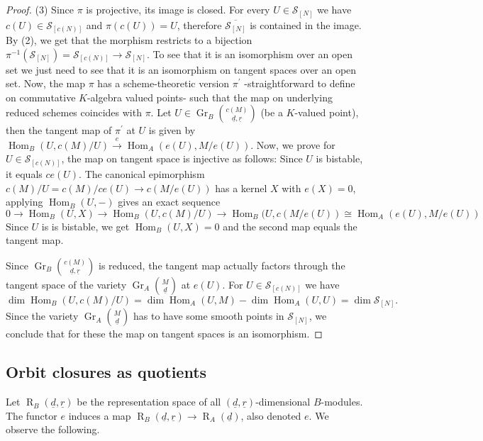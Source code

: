 \documentclass[11pt,a4paper]{amsart}
\theoremstyle{plain}
\theoremstyle{definition}
\begin{document}
\begin{proof}
(3) Since $\pi $ is projective, its image is closed. For every $U\in {\mathcal{S}_{[N]}}$ we have ${c} (U) \in {\mathcal{S}_{[{c} (N)]}}$ and $\pi (c(U)) =U$, therefore $\overline{\mathcal{S}_{[N]}}$ is contained in the image. By (2), we get that the morphism restricts to a bijection 
$\pi^{-1}({\mathcal{S}_{[N]}})={\mathcal{S}_{[{c} (N)]}} \to {\mathcal{S}_{[N]}}$. To see that it is an isomorphism over an open set we just need to see that it is an isomorphism on tangent spaces over an open set. Now, the map $\pi$ has a scheme-theoretic version $\pi^\prime$ -straightforward to define on commutative $K$-algebra valued points- such that the map on underlying reduced schemes coincides with $\pi$. Let $U\in {\operatorname{Gr}_B \binom{{c} (M)}{\underline{d}, \underline{r}}}$ (be a $K$-valued point), then the tangent map of $\pi^\prime$ at $U$ is given by $\operatorname{Hom}_B(U, c(M)/U) \xrightarrow{e} \operatorname{Hom}_A( e(U), M/e(U))$. Now, we prove for $U\in {\mathcal{S}_{[{c} (N)]}}$, the map on tangent space is injective as follows: Since $U$ is bistable, it equals $ce(U)$. The canonical epimorphism $c(M)/U=c(M)/ce(U) \to c( M/e(U))$ has a kernel $X$ with $e(X)=0$, applying $\operatorname{Hom}_B(U,-)$ gives an exact sequence 
\[ 
0\to \operatorname{Hom}_B(U,X)\to \operatorname{Hom}_B(U,c(M)/U )\to\operatorname{Hom}_B(U,c( M/e(U))\cong \operatorname{Hom}_A(e(U),M/e(U))
\]
Since $U$ is is bistable, we get $\operatorname{Hom}_B(U,X)=0$ and the second map equals the tangent map.  

Since ${\operatorname{Gr}_B \binom{{c} (M)}{\underline{d}, \underline{r}}}$ is reduced, the tangent map actually factors through the tangent space of the variety ${\operatorname{Gr}_A \binom{M}{\underline{d}}}$ at $e(U)$. For $U\in {\mathcal{S}_{[{c} (N)]}}$ we have 
\[ 
\dim \operatorname{Hom}_B(U, c(M)/U) =\dim \operatorname{Hom}_A (U, M) - \dim \operatorname{Hom}_A(U,U) =\dim {\mathcal{S}_{[N]}}.
\]
Since the variety ${\operatorname{Gr}_A \binom{M}{\underline{d}}}$ has to have some smooth points in ${\mathcal{S}_{[N]}}$, we conclude that for these the map on tangent spaces is an isomorphism. 
\end{proof}

\subsection*{Orbit closures as quotients}
Let ${\operatorname{R}_B(\underline{d},\underline{r})}$ be the representation space of all $({\underline{d}}, {\underline{r}})$-dimensional $B$-modules. 
The functor $e$ induces a map
${\operatorname{R}_B(\underline{d},\underline{r})} \to {\operatorname{R}_A(\underline{d})}$, also denoted $e$.
We observe the following. 
\end{document}

